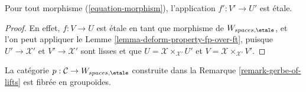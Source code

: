 \begin{lemma}
\label{lemma-morphisms-lifts-etale}
Pour tout morphisme (\ref{equation-morphism}), l'application $f' : V' \to U'$ est \'etale.
\end{lemma}

\begin{proof}
En effet, $f : V \to U$ est \'etale en tant que morphisme de $W_{spaces, \etale}$,
et l'on peut appliquer le
Lemme \ref{lemma-deform-property-fp-over-ft}, puisque $U' \to \mathcal{X}'$
et $V' \to \mathcal{X}'$ sont lisses et que
$U = \mathcal{X} \times_{\mathcal{X}'} U'$ et
$V = \mathcal{X} \times_{\mathcal{X}'} V'$.
\end{proof}

\begin{lemma}
\label{lemma-gerbe-of-lifts-fibred}
La catégorie $p : \mathcal{C} \to W_{spaces, \etale}$ construite
dans la Remarque \ref{remark-gerbe-of-lifts} est fibrée en groupoïdes.
\end{lemma}

